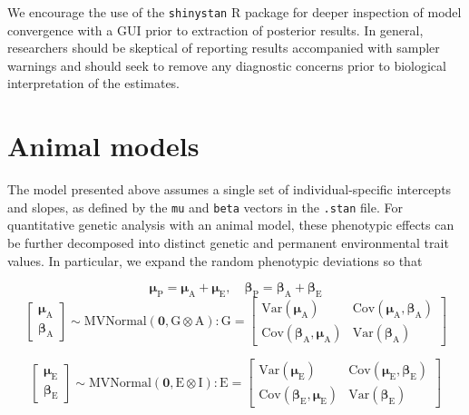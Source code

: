 \documentclass[
]{book}
\begin{document}
We encourage the use of the \texttt{shinystan} R package for deeper inspection of model convergence with a GUI prior to extraction of posterior results. In general, researchers should be skeptical of reporting results accompanied with sampler warnings and should seek to remove any diagnostic concerns prior to biological interpretation of the estimates.

\hypertarget{animal-models}{%
\section{Animal models}\label{animal-models}}

The model presented above assumes a single set of individual-specific intercepts and slopes, as defined by the \texttt{mu} and \texttt{beta} vectors in the \texttt{.stan} file. For quantitative genetic analysis with an animal model, these phenotypic effects can be further decomposed into distinct genetic and permanent environmental trait values. In particular, we expand the random phenotypic deviations so that

\[ \boldsymbol{\mu_{\mathrm{P}}} =  \boldsymbol{\mu_{\mathrm{A}}} + \boldsymbol{\mu_{\mathrm{E}}}, \quad 
 \boldsymbol{\beta_{\mathrm{P}}} =  \boldsymbol{\beta_{\mathrm{A}}} + \boldsymbol{\beta_{\mathrm{E}}}\]
\[ \begin{bmatrix}
\boldsymbol{\mu_{\mathrm{A}}} \\ 
\boldsymbol{\beta_{\mathrm{A}}} 
\end{bmatrix} \sim \mathrm{MVNormal}(\boldsymbol{0}, \boldsymbol{\mathrm{G}} \otimes   \boldsymbol{\mathrm{A}}) : 
\boldsymbol{\mathrm{G}} =
\begin{bmatrix}
\mathrm{Var}( \boldsymbol{\mu_{\mathrm{A}}} ) &  
\mathrm{Cov}( \boldsymbol{\mu_{\mathrm{A}}},  \boldsymbol{\beta_{\mathrm{A}}})     \\ 
\mathrm{Cov}(\boldsymbol{\beta_{\mathrm{A}}}, \boldsymbol{\mu_{\mathrm{A}}} ) & 
\mathrm{Var}( \boldsymbol{\beta_{\mathrm{A}}} )
\end{bmatrix} \]

\[ \begin{bmatrix}
\boldsymbol{\mu_{\mathrm{E}}} \\ 
\boldsymbol{\beta_{\mathrm{E}}} 
\end{bmatrix} \sim \mathrm{MVNormal}(\boldsymbol{0}, \boldsymbol{\mathrm{E}} \otimes   \boldsymbol{\mathrm{I}}) : 
\boldsymbol{\mathrm{E}} =
\begin{bmatrix}
\mathrm{Var}( \boldsymbol{\mu_{\mathrm{E}}} ) &  
\mathrm{Cov}( \boldsymbol{\mu_{\mathrm{E}}},  \boldsymbol{\beta_{\mathrm{E}}})     \\ 
\mathrm{Cov}(\boldsymbol{\beta_{\mathrm{E}}}, \boldsymbol{\mu_{\mathrm{E}}} ) & 
\mathrm{Var}( \boldsymbol{\beta_{\mathrm{E}}} )
\end{bmatrix} \]
\end{document}
